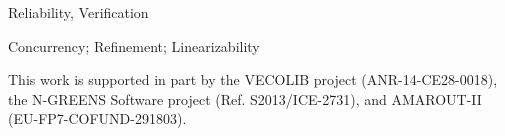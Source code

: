 \documentclass[9pt,natbib,authoryear]{sigplanconf}
\begin{document}

\terms
Reliability, Verification

\keywords
Concurrency; Refinement; Linearizability













\appendix



\acks This work is supported in part by the VECOLIB project (ANR-14-CE28-0018),
the N-GREENS Software project (Ref. S2013/ICE-2731), and AMAROUT-II
(EU-FP7-COFUND-291803).




% 
\end{document}

